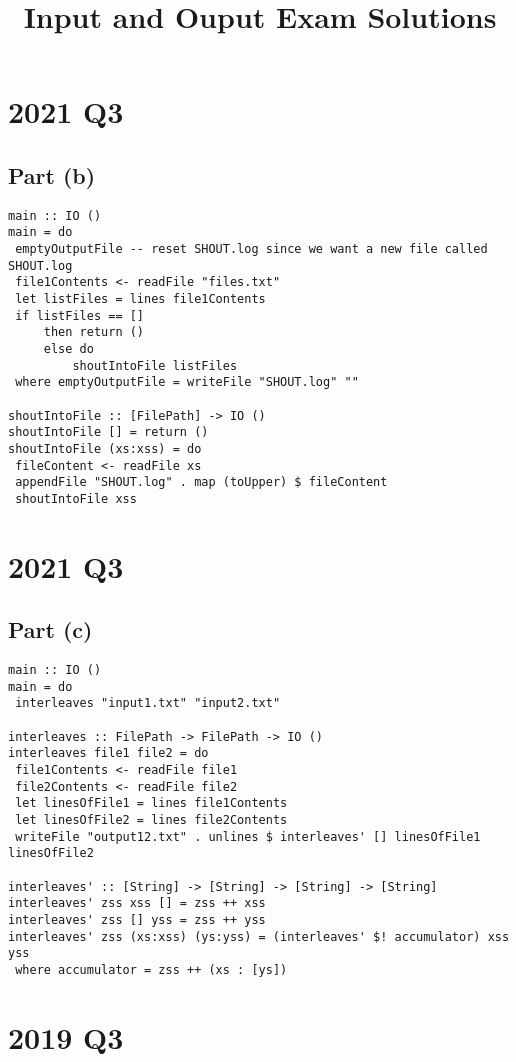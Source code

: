 \documentclass[11pt]{article}
\date{}
\title{Input and Ouput Exam Solutions}
\begin{document}
\maketitle
\section{2021 Q3}
\label{sec:org077e20f}
\subsection{Part (b)}
\label{sec:org44abff3}
\begin{verbatim}
main :: IO ()
main = do
 emptyOutputFile -- reset SHOUT.log since we want a new file called SHOUT.log
 file1Contents <- readFile "files.txt"
 let listFiles = lines file1Contents
 if listFiles == []
     then return ()
     else do
         shoutIntoFile listFiles
 where emptyOutputFile = writeFile "SHOUT.log" ""

shoutIntoFile :: [FilePath] -> IO ()
shoutIntoFile [] = return ()
shoutIntoFile (xs:xss) = do
 fileContent <- readFile xs
 appendFile "SHOUT.log" . map (toUpper) $ fileContent
 shoutIntoFile xss
\end{verbatim}
\newpage
\section{2021 Q3}
\label{sec:org9623f5a}
\subsection{Part (c)}
\label{sec:org007737f}
\begin{verbatim}
main :: IO ()
main = do
 interleaves "input1.txt" "input2.txt"

interleaves :: FilePath -> FilePath -> IO ()
interleaves file1 file2 = do
 file1Contents <- readFile file1
 file2Contents <- readFile file2
 let linesOfFile1 = lines file1Contents
 let linesOfFile2 = lines file2Contents
 writeFile "output12.txt" . unlines $ interleaves' [] linesOfFile1 linesOfFile2

interleaves' :: [String] -> [String] -> [String] -> [String]
interleaves' zss xss [] = zss ++ xss
interleaves' zss [] yss = zss ++ yss
interleaves' zss (xs:xss) (ys:yss) = (interleaves' $! accumulator) xss yss
 where accumulator = zss ++ (xs : [ys])
\end{verbatim}
\section{2019 Q3}
\label{sec:orgbe95f44}
\end{document}
